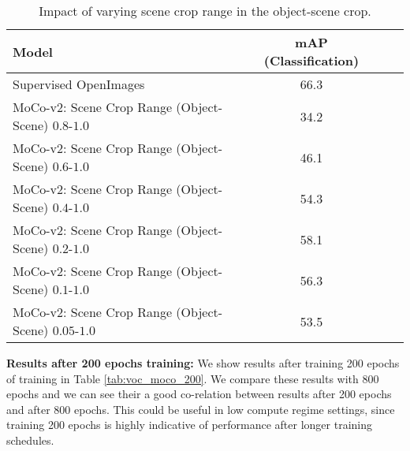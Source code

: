 \begin{table*}
    \centering
    \begin{tabu} to \linewidth {lccc} 
        \toprule
        Model & mAP (Classification) \\
         \midrule
         Supervised OpenImages & 66.3
        \\ 
         \midrule
       
       MoCo-v2: Scene Crop Range (Object-Scene) $0.8$-$1.0$ & 34.2 \\
       MoCo-v2: Scene Crop Range (Object-Scene) $0.6$-$1.0$ & 46.1 \\
       MoCo-v2: Scene Crop Range (Object-Scene) $0.4$-$1.0$ & 54.3 \\
       MoCo-v2: Scene Crop Range (Object-Scene) $0.2$-$1.0$ & 58.1 \\
       MoCo-v2: Scene Crop Range (Object-Scene) $0.1$-$1.0$ & 56.3 \\
       MoCo-v2: Scene Crop Range (Object-Scene) $0.05$-$1.0$ & 53.5 \\
        \bottomrule
    \end{tabu}
    \vspace{0.1in}
    \caption{Impact of varying scene crop range in the object-scene crop.}
    \label{tab:openimages_scene_crop_vary}
\end{table*}




\textbf{Results after 200 epochs training:} We show results after training 200 epochs of training in Table \ref{tab:voc_moco_200}. We compare these results with 800 epochs and we can see their a good co-relation between results after 200 epochs and after 800 epochs. This could be useful in low compute regime  settings, since training 200 epochs is highly indicative of performance after longer training schedules.

